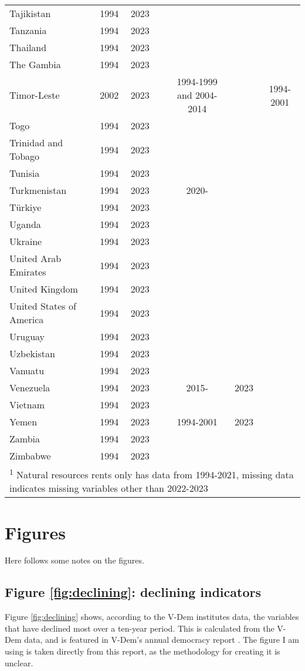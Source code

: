 {\begin{longtable}{lcccccc}
Tajikistan & 1994 & 2023 &  &  &  & \\
Tanzania & 1994 & 2023 &  &  &  & \\
Thailand & 1994 & 2023 &  &  &  & \\
The Gambia & 1994 & 2023 &  &  &  & \\
\addlinespace
Timor-Leste & 2002 & 2023 &  & 1994-1999 and 2004-2014 &  & 1994-2001\\
Togo & 1994 & 2023 &  &  &  & \\
Trinidad and Tobago & 1994 & 2023 &  &  &  & \\
Tunisia & 1994 & 2023 &  &  &  & \\
Turkmenistan & 1994 & 2023 &  & 2020- &  & \\
\addlinespace
Türkiye & 1994 & 2023 &  &  &  & \\
Uganda & 1994 & 2023 &  &  &  & \\
Ukraine & 1994 & 2023 &  &  &  & \\
United Arab Emirates & 1994 & 2023 &  &  &  & \\
United Kingdom & 1994 & 2023 &  &  &  & \\
\addlinespace
United States of America & 1994 & 2023 &  &  &  & \\
Uruguay & 1994 & 2023 &  &  &  & \\
Uzbekistan & 1994 & 2023 &  &  &  & \\
Vanuatu & 1994 & 2023 &  &  &  & \\
Venezuela & 1994 & 2023 &  & 2015- & 2023 & \\
\addlinespace
Vietnam & 1994 & 2023 &  &  &  & \\
Yemen & 1994 & 2023 &  & 1994-2001 & 2023 & \\
Zambia & 1994 & 2023 &  &  &  & \\
Zimbabwe & 1994 & 2023 &  &  &  & \\
\bottomrule
\multicolumn{7}{l}{\rule{0pt}{1em}\textsuperscript{1} Natural resources rents only has data from 1994-2021, missing data indicates missing variables other than 2022-2023}\\
\end{longtable}
}

\section{Figures}
Here follows some notes on the figures.

\subsection{Figure \ref{fig:declining}: declining indicators}
Figure \ref{fig:declining} shows, according to the V-Dem institutes data, the variables that have declined most over a ten-year period. This is calculated from the V-Dem data, and is featured in V-Dem's annual democracy report \citep[p. 17]{nord_democracy_2025}. The figure I am using is taken directly from this report, as the methodology for creating it is unclear.

